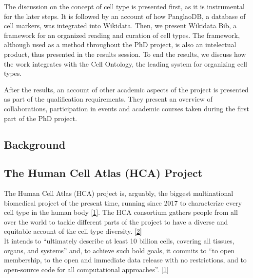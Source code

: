The discussion on the concept of cell type is presented first, as it is instrumental for the later steps.
It is followed by an account of how PanglaoDB, a database of cell markers, was integrated into Wikidata.
Then, we present Wikidata Bib, a framework for an organized reading and curation of cell types.
The framework, although used as a method throughout the PhD project, is also an intelectual product, thus presented in the results session.
To end the results, we discuss how the work integrates with the Cell Ontology, the leading system for organizing cell types.

After the results, an account of other academic aspects of the project is presented as part of the qualification requirements.
They present an overview of collaborations, participation in events and academic courses taken during the first part of the PhD project.

\hypertarget{background}{%
\subsection{Background}\label{background}}

\hypertarget{the-human-cell-atlas-hca-project}{%
\subsection{The Human Cell Atlas (HCA) Project}\label{the-human-cell-atlas-hca-project}}

The Human Cell Atlas (HCA) project is, arguably, the biggest multinational biomedical project of the present time, running since 2017 to characterize every cell type in the human body {[}\protect\hyperlink{ref-1GmbExweg}{1}{]}.
The HCA consortium gathers people from all over the world to tackle different parts of the project to have a diverse and equitable account of the cell type diversity. {[}\protect\hyperlink{ref-tjdjR2Xf}{2}{]}\\
It intends to ``ultimately describe at least 10 billion cells, covering all tissues, organs, and systems'' and, to achieve such bold goals, it commits to ``to open membership, to the open and immediate data release with no restrictions, and to open-source code for all computational approaches''. {[}\protect\hyperlink{ref-1GmbExweg}{1}{]}

